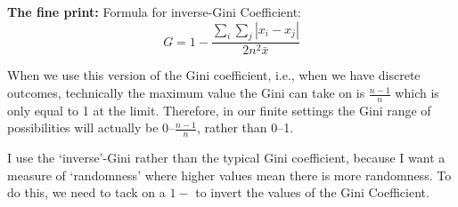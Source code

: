 \documentclass[a4paper, 11pt]{article}
\begin{document}
\noindent\textbf{The fine print:}
Formula for inverse-Gini Coefficient:
$$G= 1-\frac{\sum_i \sum_j |x_i - x_j|}{2 n^2 \bar{x}} $$

When we use this version of the Gini coefficient, i.e., when we have discrete outcomes, technically the maximum value the Gini can take on is $\frac{n-1}{n}$ which is only equal to 1 at the limit. Therefore, in our finite settings the Gini range of possibilities will actually be 0--$\frac{n-1}{n}$, rather than 0--1.

I use the `inverse'-Gini rather than the typical Gini coefficient, because I want a measure of `randomness' where higher values mean there is more randomness. To do this, we need to tack on a $1-$ to invert the values of the Gini Coefficient.


\newpage






\setlength\bibsep{0pt}
\nocite{*}
\end{document}

